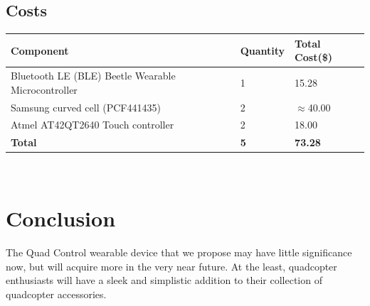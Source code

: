 \documentclass[12pt,letterpaper]{article}
\begin{document}
\subsection*{Costs}
\begin{tabular}{| l | l | l |}
	\hline
	Component & Quantity & Total Cost(\$) \\ \hline
	Bluetooth LE (BLE) Beetle Wearable Microcontroller & 1 & 15.28 \\ \hline
	Samsung curved cell (PCF441435) & 2 & $\approx$40.00\\ \hline
	Atmel AT42QT2640 Touch controller & 2 & 18.00\\ \hline
	\textbf{Total} & \textbf{5} & \textbf{73.28}\\ \hline
\end{tabular} \\



\section*{Conclusion}
The Quad Control wearable device that we propose may have little significance now, but will acquire more in the very near future. At the least, quadcopter enthusiasts will have a sleek and simplistic addition to their collection of quadcopter accessories. 

\newpage
\nocite{*}


\end{document}
